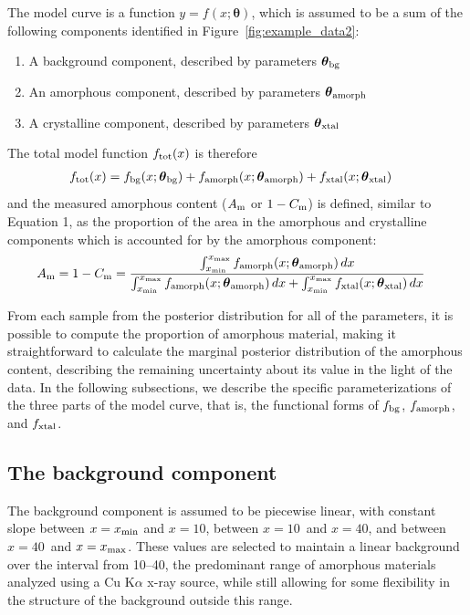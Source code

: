\documentclass[preprint, a4paper]{elsarticle}
\newcommand{\params}{\boldsymbol{\theta}}
\newcommand{\x}{x}
\begin{document}
The model curve is a function $y = f(\x; \params)$,
which is assumed to be a sum of the following components identified in Figure~\ref{fig:example_data2}:
\begin{enumerate}
\item A background component, described by parameters $\params_{\rm bg}$
\item An amorphous component, described by parameters $\params_{\rm amorph}$
\item A crystalline component, described by parameters $\params_{\rm xtal}$
\end{enumerate}
The total model function $f_{\rm tot}(x)$ is therefore
\begin{align}
f_{\rm tot}(\x) &= f_{\rm bg}(\x; \params_{\rm bg})
       + f_{\rm amorph}(\x; \params_{\rm amorph})
       + f_{\rm xtal}(\x; \params_{\rm xtal})
\end{align}
and the measured amorphous content ($A_{\rm m}$ or $1-C_{\rm m}$) is defined, similar to Equation 1, as the proportion of the area in the
amorphous and crystalline components which is accounted for by the amorphous component:
\begin{align}
{A_{\rm m} = 1-C_{\rm m}} &= \frac{\int_{\x_{\rm min}}^{\x_{\rm max}}
            f_{\rm amorph}(\x; \params_{\rm amorph}) \, d\x}
          {\int_{\x_{\rm min}}^{\x_{\rm max}}
            f_{\rm amorph}(\x; \params_{\rm amorph}) \, dx
            + \int_{\x_{\rm min}}^{\x_{\rm max}} f_{\rm xtal}(\x; \params_{\rm xtal}) \, d\x} \label{eqn:crystallinity}
\end{align}

From each sample from the posterior distribution for all of the parameters,
it is possible to compute the proportion of amorphous material, making it straightforward to
calculate the marginal posterior distribution of the amorphous content, describing
the remaining uncertainty about its value in the light of the data.
In the following subsections, we describe the specific parameterizations of the
three parts of the model curve, that is, the functional forms of
$f_{\rm bg}$, $f_{\rm amorph}$, and $f_{\rm xtal}$.

\subsection{The background component}
The background component is assumed to be piecewise linear, with constant
slope
{between $\x=\x_{\rm min}$ and $\x=10$\degree, between $\x=10$\degree~and $\x=40$\degree,
and between $\x=40$\degree~and $\x=\x_{\rm max}$}. These values are selected to maintain a linear background over the interval from 10--40\degree, the predominant range of amorphous materials analyzed using a Cu K$\alpha$ x-ray source, while still allowing for some flexibility in the structure of the background outside this range.
\end{document}
